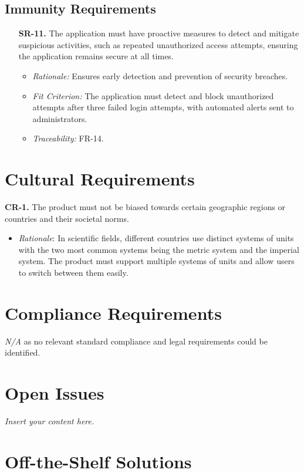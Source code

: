 \documentclass[12pt]{article}
\newcommand{\lips}{\textit{Insert your content here.}}
\begin{document}
\subsection{Immunity Requirements}
\begin{enumerate}
  \item[\textbf{SR-11.}] The application must have proactive measures to detect
  and mitigate suspicious activities, such as repeated unauthorized access
  attempts, ensuring the application remains secure at all times.
  \begin{itemize}
    \item \textit{Rationale:} Ensures early detection and prevention of security
    breaches.
    \item \textit{Fit Criterion:} The application must detect and block
    unauthorized attempts after three failed login attempts, with automated
    alerts sent to administrators.
    \item \textit{Traceability:} FR-14.
  \end{itemize}
\end{enumerate}

\section{Cultural Requirements}
\textbf{CR-1.} The product must not be biased towards certain geographic regions or countries and their societal norms.
\begin{itemize}
  \item \emph{Rationale}: In scientific fields, different countries use distinct systems of units with the two most
  common systems being the metric system and the imperial system. The product must support multiple systems of units
  and allow users to switch between them easily.
\end{itemize}

\section{Compliance Requirements}
\emph{N/A} as no relevant standard compliance and legal requirements could be identified.

\section{Open Issues}
\lips
\section{Off-the-Shelf Solutions}
\end{document}
